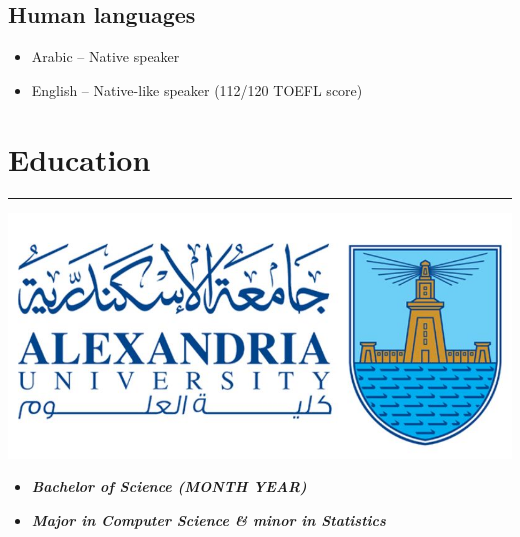 \documentclass[10pt]{article}
\newcommand{\fancy}[1]{\Large\textbf{\textit{#1}}}
\begin{document}
\subsection*{\Large{Human languages}}
\begin{itemize}
    \item Arabic -- Native speaker
    \item English -- Native-like speaker (112/120 TOEFL score)
\end{itemize}




\section*{Education}
\hrule
\noindent

\begin{minipage}{0.3\textwidth}
\vspace{1em}
\begin{center}
    \includegraphics[width=\textwidth]{FOS_logo.jpg}
\end{center}
\end{minipage}
\hspace{-2pt}
\begin{minipage}{0.7\textwidth}
\vspace{2em}
\begin{center}
    \begin{itemize}
        \item \large \fancy{Bachelor of Science (MONTH YEAR)}
    \end{itemize}
    \begin{itemize}
        \item \large \fancy{Major in Computer Science \& minor in Statistics}
    \end{itemize}
\end{center}
\end{minipage}
\end{document}
